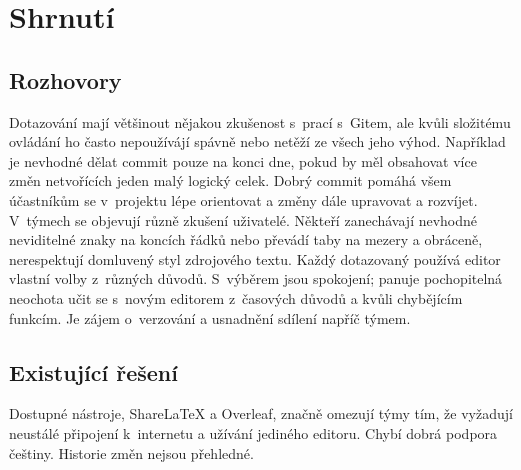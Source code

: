 \section{Shrnutí}

\subsection{Rozhovory}

Dotazování mají většinout nějakou zkušenost s~prací s~Gitem, ale kvůli složitému ovládání ho často nepoužívájí spávně nebo netěží ze všech jeho výhod. Například je nevhodné dělat commit pouze na konci dne, pokud by měl obsahovat více změn netvořících jeden malý logický celek. Dobrý commit pomáhá všem účastníkům se v~projektu lépe orientovat a změny dále upravovat a rozvíjet. V~týmech se objevují různě zkušení uživatelé. Někteří zanechávají nevhodné neviditelné znaky na koncích řádků nebo převádí taby na mezery a obráceně, nerespektují domluvený styl zdrojového textu. Každý dotazovaný používá editor vlastní volby z~různých důvodů. S~výběrem jsou spokojení; panuje pochopitelná neochota učit se s~novým editorem z~časových důvodů a kvůli chybějícím funkcím. Je zájem o~verzování a usnadnění sdílení napříč týmem.

\subsection{Existující řešení}

Dostupné nástroje, ShareLaTeX a Overleaf, značně omezují týmy tím, že vyžadují neustálé připojení k~internetu a užívání jediného editoru. Chybí dobrá podpora češtiny. Historie změn nejsou přehledné.